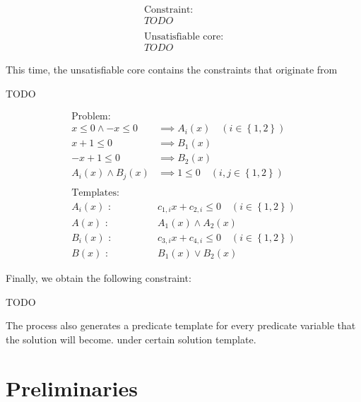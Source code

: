 \documentclass[master,final,12pt]{iscs-thesis}
\begin{document}
\begin{align*}
\text{Constraint:} \\
TODO \\
\\
\text{Unsatisfiable core:} \\
TODO
\end{align*}

This time, the unsatisfiable core contains the constraints that
originate from

TODO

\begin{align*}
\text{Problem:} \\
x \leq 0 \wedge -x \leq 0 & \implies A_i(x) \quad (i \in \left\lbrace 1,2 \right\rbrace ) \\
x+1 \leq 0 & \implies B_1(x) \\
-x+1 \leq 0 & \implies B_2(x) \\
A_i(x) \wedge B_j(x) & \implies 1 \leq 0 \quad (i,j \in \left\lbrace 1,2 \right\rbrace ) \\
\\
\text{Templates:} \\
A_i(x) \text{ : } & c_{1,i} x + c_{2,i} \leq 0 \quad (i \in \left\lbrace 1,2 \right\rbrace ) \\
A(x) \text{ : } & A_1(x) \wedge A_2(x) \\
B_i(x) \text{ : } & c_{3,i} x + c_{4,i} \leq 0 \quad (i \in \left\lbrace 1,2 \right\rbrace ) \\
B(x) \text{ : } & B_1(x) \vee B_2(x)
\end{align*}

Finally, we obtain the following constraint:

TODO


The process also generates a predicate template for every predicate
variable that the solution will become.  under certain solution
template.

\section{Preliminaries}
\end{document}

